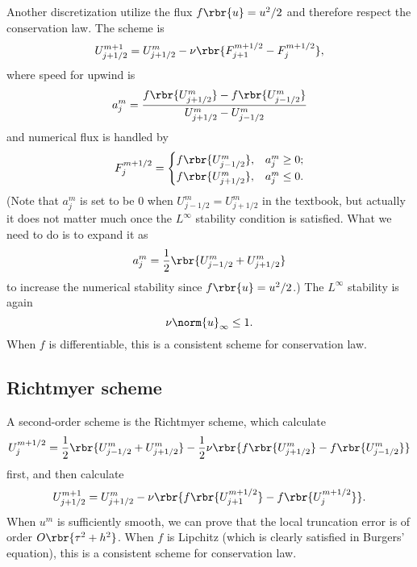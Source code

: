 \documentclass[english, nochinese]{pnote}
\begin{document}
Another discretization utilize the flux $ f \rbr{u} = u^2 / 2 $ and therefore respect the conservation law. The scheme is
\begin{equation}
U_{ j + 1 / 2 }^{ m + 1 } = U_{ j + 1 / 2 }^m - \nu \rbr{ F_{ j + 1 }^{ m + 1 / 2 } - F_j^{ m + 1 / 2 } },
\end{equation}
where speed for upwind is
\begin{equation}
a_j^m = \frac{ f \rbr{U_{ j + 1 / 2 }^m} - f \rbr{U_{ j - 1 / 2 }^m} }{ U_{ j + 1 / 2 }^m - U_{ j - 1 / 2 }^m }
\end{equation}
and numerical flux is handled by
\begin{equation}
F_j^{ m + 1 / 2 } =
\begin{cases}
f \rbr{U_{ j - 1 / 2 }^m}, & a_j^m \ge 0; \\
f \rbr{U_{ j + 1 / 2 }^m}, & a_j^m \le 0.
\end{cases}
\end{equation}
(Note that $a_j^m$ is set to be $0$ when $ U_{ j - 1 / 2 }^m = U_{ j + 1 / 2 }^m $ in the textbook, but actually it does not matter much once the $L^{\infty}$ stability condition is satisfied. What we need to do is to expand it as
\begin{equation}
a_j^m = \frac{1}{2} \rbr{ U_{ j - 1 / 2 }^m + U_{ j + 1 / 2 }^m }
\end{equation}
to increase the numerical stability since $ f \rbr{u} = u^2 / 2 $.) The $L^{\infty}$ stability is again
\begin{equation}
\nu \norm{u}_{\infty} \le 1.
\end{equation}
When $f$ is differentiable, this is a consistent scheme for conservation law.

\subsection{Richtmyer scheme}

A second-order scheme is the Richtmyer scheme, which calculate
\begin{equation}
U_j^{ m + 1 / 2 } = \frac{1}{2} \rbr{ U_{ j - 1 / 2 }^m + U_{ j + 1 / 2 }^m } - \frac{1}{2} \nu \rbr{ f \rbr{U_{ j + 1 / 2 }^m} - f \rbr{U_{ j - 1 / 2 }^m} }
\end{equation}
first, and then calculate
\begin{equation}
U_{ j + 1 / 2 }^{ m + 1 } = U_{ j + 1 / 2 }^m - \nu \rbr{ f \rbr{U_{ j + 1 }^{ m + 1 / 2 }} - f \rbr{U_j^{ m + 1 / 2 }} }.
\end{equation}
When $u^m$ is sufficiently smooth, we can prove that the local truncation error is of order $ O \rbr{ \tau^2 + h^2 } $. When $f$ is Lipchitz (which is clearly satisfied in Burgers' equation), this is a consistent scheme for conservation law.
\end{document}
